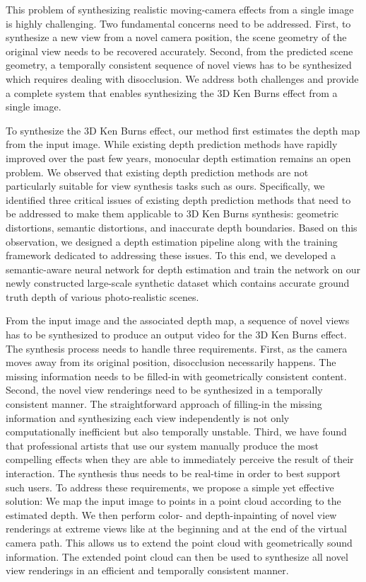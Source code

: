 \documentclass[acmtog,authorversion]{acmart}
\begin{document}
This problem of synthesizing realistic moving-camera effects from a single image is highly challenging. Two fundamental concerns need to be addressed. First, to synthesize a new view from a novel camera position, the scene geometry of the original view needs to be recovered accurately. Second, from the predicted scene geometry, a temporally consistent sequence of novel views has to be synthesized which requires dealing with disocclusion. We address both challenges and provide a complete system that enables synthesizing the 3D Ken Burns effect from a single image.

To synthesize the 3D Ken Burns effect, our method first estimates the depth map from the input image. While existing depth prediction methods have rapidly improved over the past few years, monocular depth estimation remains an open problem. We observed that existing depth prediction methods are not particularly suitable for view synthesis tasks such as ours. Specifically, we identified three critical issues of existing depth prediction methods that need to be addressed to make them applicable to 3D Ken Burns synthesis: geometric distortions, semantic distortions, and inaccurate depth boundaries. Based on this observation, we designed a depth estimation pipeline along with the training framework dedicated to addressing these issues. To this end, we developed a semantic-aware neural network for depth estimation and train the network on our newly constructed large-scale synthetic dataset which contains accurate ground truth depth of various photo-realistic scenes.

From the input image and the associated depth map, a sequence of novel views has to be synthesized to produce an output video for the 3D Ken Burns effect. The synthesis process needs to handle three requirements. First, as the camera moves away from its original position, disocclusion necessarily happens. The missing information needs to be filled-in with geometrically consistent content. Second, the novel view renderings need to be synthesized in a temporally consistent manner. The straightforward approach of filling-in the missing information and synthesizing each view independently is not only computationally inefficient but also temporally unstable. Third, we have found that professional artists that use our system manually produce the most compelling effects when they are able to immediately perceive the result of their interaction. The synthesis thus needs to be real-time in order to best support such users. To address these requirements, we propose a simple yet effective solution: We map the input image to points in a point cloud according to the estimated depth. We then perform color- and depth-inpainting of novel view renderings at extreme views like at the beginning and at the end of the virtual camera path. This allows us to extend the point cloud with geometrically sound information. The extended point cloud can then be used to synthesize all novel view renderings in an efficient and temporally consistent manner.
\end{document}
